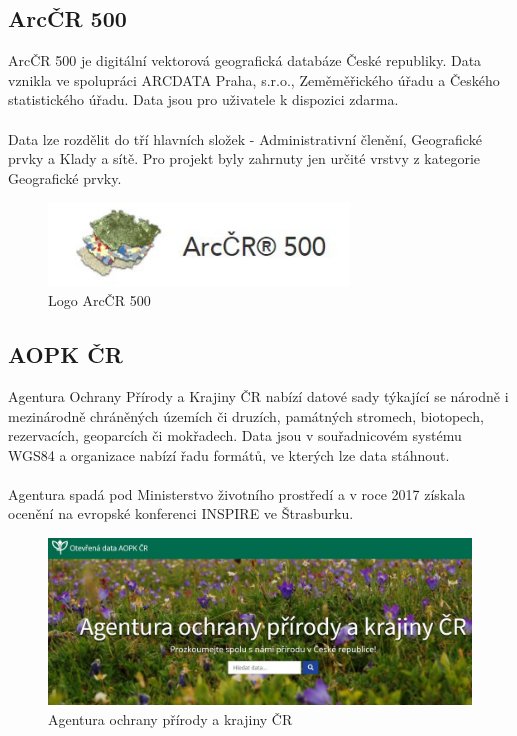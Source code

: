 \documentclass[a4paper, 12pt]{article}
\begin{document}
\subsection{ArcČR 500}
ArcČR 500 je digitální vektorová geografická databáze České republiky. Data vznikla ve spolupráci ARCDATA Praha, s.r.o., Zeměměřického úřadu a Českého statistického úřadu. Data jsou pro uživatele k dispozici zdarma. \\
\\
Data lze rozdělit do tří hlavních složek - Administrativní členění, Geografické prvky a Klady a sítě. Pro projekt byly zahrnuty jen určité vrstvy z kategorie Geografické prvky. 

\begin{figure}[h!]
	\centering
	\includegraphics[width=8cm]{pictures/arccr.jpg}
	\caption{Logo ArcČR 500}
\end{figure}

\subsection{AOPK ČR}
Agentura Ochrany Přírody a Krajiny ČR nabízí datové sady týkající se národně i mezinárodně chráněných územích či druzích, památných stromech, biotopech, rezervacích, geoparcích či mokřadech. Data jsou v souřadnicovém systému WGS84 a organizace nabízí řadu formátů, ve kterých lze data stáhnout.\\
\\
Agentura spadá pod Ministerstvo životního prostředí a v roce 2017 získala ocenění na evropské konferenci INSPIRE ve Štrasburku. 

\begin{figure}[h!]
	\centering
	\includegraphics[width=12cm]{pictures/aopk.jpg}
	\caption{Agentura ochrany přírody a krajiny ČR}
\end{figure}
\end{document}
